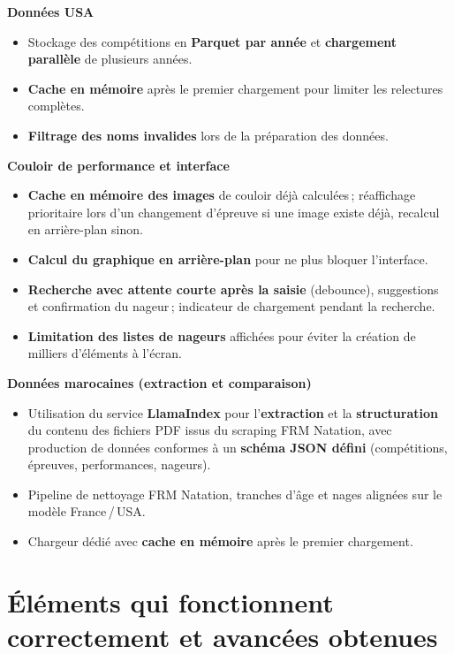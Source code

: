 \documentclass[11pt,a4paper]{article}
\begin{document}
\textbf{Données USA}
\begin{itemize}
  \item Stockage des compétitions en \textbf{Parquet par année} et \textbf{chargement parallèle} de plusieurs années.
  \item \textbf{Cache en mémoire} après le premier chargement pour limiter les relectures complètes.
  \item \textbf{Filtrage des noms invalides} lors de la préparation des données.
\end{itemize}

\textbf{Couloir de performance et interface}
\begin{itemize}
  \item \textbf{Cache en mémoire des images} de couloir déjà calculées\,; réaffichage prioritaire lors d'un changement d'épreuve si une image existe déjà, recalcul en arrière-plan sinon.
  \item \textbf{Calcul du graphique en arrière-plan} pour ne plus bloquer l'interface.
  \item \textbf{Recherche avec attente courte après la saisie} (debounce), suggestions et confirmation du nageur\,; indicateur de chargement pendant la recherche.
  \item \textbf{Limitation des listes de nageurs} affichées pour éviter la création de milliers d'éléments à l'écran.
\end{itemize}

\textbf{Données marocaines (extraction et comparaison)}
\begin{itemize}
  \item Utilisation du service \textbf{LlamaIndex} pour l'\textbf{extraction} et la \textbf{structuration} du contenu des fichiers PDF issus du scraping FRM Natation, avec production de données conformes à un \textbf{schéma JSON défini} (compétitions, épreuves, performances, nageurs).
  \item Pipeline de nettoyage FRM Natation, tranches d'âge et nages alignées sur le modèle France\,/\,USA.
  \item Chargeur dédié avec \textbf{cache en mémoire} après le premier chargement.
\end{itemize}

\section{Éléments qui fonctionnent correctement et avancées obtenues}
\end{document}
